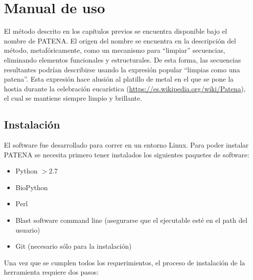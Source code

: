 \chapter{Manual de uso}\label{manual}


El método descrito en los capítulos previos se encuentra disponible bajo el nombre de \mbox{PATENA}. 
El origen del nombre se encuentra en la descripción del método, metafóricamente, como un mecanismo para ``limpiar'' secuencias, eliminando elementos funcionales y estructurales.
De esta forma, las secuencias resultantes podrían describirse usando la expresión popular ``limpias como una patena''.
Esta expresión hace alusión al platillo de metal en el que se pone la hostia durante la celebración eucarística (\url{https://es.wikipedia.org/wiki/Patena}), el cual se mantiene siempre limpio y brillante.



\section{Instalación}



El software fue desarrollado para correr en un entorno Linux.
Para poder instalar PATENA se necesita primero tener instalados los siguientes paquetes de software:

\begin{itemize}
 \item Python $>$2.7 \cite{python}
 \item BioPython \cite{biopython}
 \item Perl \cite{perl}
 \item Blast software command line \cite{blastLocal} (asegurarse que el ejecutable esté en el path del usuario)
 \item Git \cite{git} (necesario sólo para la instalación)
\end{itemize}

Una vez que se cumplen todos los requerimientos, el proceso de instalación de la herramienta requiere dos pasos: \\ 


